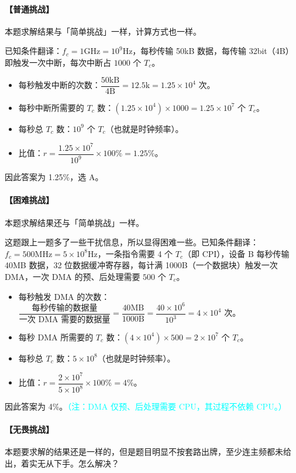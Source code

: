 \documentclass[UTF8]{ctexart}
\begin{document}
\paragraph{【普通挑战】} 本题求解结果与「简单挑战」一样，计算方式也一样。

已知条件翻译：$f_c = \mathrm{1 GHz = 10^9 Hz}$，每秒传输 50kB 数据，每传输 32bit（4B）即触发一次中断，每次中断占 $1000$ 个 $T_c$。

\begin{itemize}[parsep=1pt]
  \item 每秒触发中断的次数：$\mathrm{\dfrac{50kB}{4B} = 12.5k = 1.25\times 10^4}$ 次。
  \item 每秒中断所需要的 $T_c$ 数：$\mathrm{(1.25\times 10^4)\times 1000 = 1.25\times 10^7}$ 个 $T_c$。
  \item 每秒总 $T_c$ 数：$10^9$ 个 $T_c$（也就是时钟频率）。
  \item 比值：$r = \dfrac{1.25\times 10^7}{10^9}\times 100\% = 1.25\%$。
\end{itemize}
因此答案为 1.25\%，选 A。

\paragraph{【困难挑战】} 本题求解结果还与「简单挑战」一样。

这题跟上一题多了一些干扰信息，所以显得困难一些。已知条件翻译：$f_c = \mathrm{500 MHz = 5\times 10^8 Hz}$，一条指令需要 4 个 $T_c$（即 CPI），设备 B 每秒传输 40MB 数据，32 位数据缓冲寄存器，每计满 1000B（一个数据块）触发一次 DMA，一次 DMA 的预、后处理需要 $500$ 个 $T_c$。

\begin{itemize}
  \item 每秒触发 DMA 的次数：$\dfrac{\text{每秒传输的数据量}}{\text{一次 DMA 需要的数据量}} = \mathrm{\dfrac{ 40MB }{ 1000B} = \dfrac{40\times 10^6}{10^3}} = 4\times 10^4$ 次。
  \item 每秒 DMA 所需要的 $T_c$ 数：$(4\times 10^4) \times 500 = 2\times 10^7$ 个 $T_c$。
  \item 每秒总 $T_c$ 数：$5\times 10^8$（也就是时钟频率）。
  \item 比值：$r = \dfrac{2\times 10^7}{5\times 10^8}\times 100\% = 4\%$。
\end{itemize}
因此答案为 4\%。\textcolor{cyan}{（注：DMA 仅预、后处理需要 CPU，其过程不依赖 CPU。）}

\paragraph{【无畏挑战】} 本题要求解的结果还是一样的，但是题目明显不按套路出牌，至少连主频都未给出，着实无从下手。怎么解决？
\end{document}
